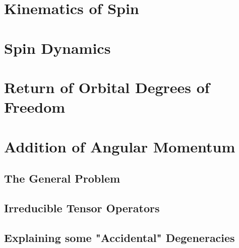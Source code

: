 \section{Kinematics of Spin}
\section{Spin Dynamics}
\section{Return of Orbital Degrees of Freedom}
\section{Addition of Angular Momentum }
\subsection{The General Problem}
\subsection{Irreducible Tensor Operators}
\subsection{Explaining some "Accidental" Degeneracies}
